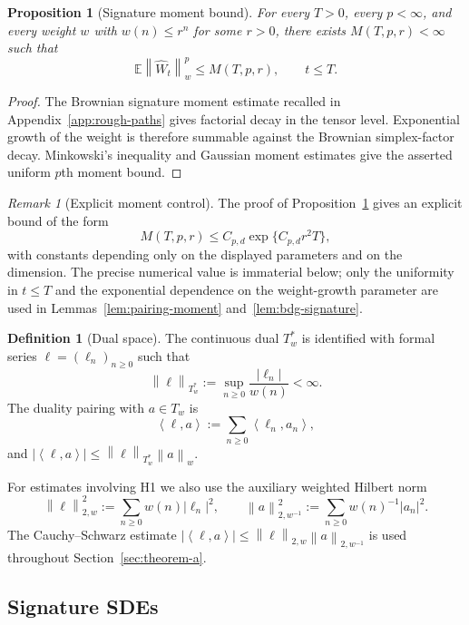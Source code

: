 \documentclass[11pt,oneside]{article}
\theoremstyle{plain}
\newtheorem{proposition}[theorem]{Proposition}
\theoremstyle{definition}
\newtheorem{definition}[theorem]{Definition}
\theoremstyle{remark}
\newtheorem{remark}[theorem]{Remark}
\newcommand{\E}{\mathbb{E}}
\newcommand{\Tw}{T_w}
\newcommand{\Tstarw}{T_w^\ast}
\newcommand{\cW}{\widehat W}
\newcommand{\norm}[1]{\left\lVert #1\right\rVert}
\newcommand{\abs}[1]{\left\lvert #1\right\rvert}
\newcommand{\inner}[2]{\left\langle #1,#2\right\rangle}
\begin{document}
\begin{proposition}[Signature moment bound]\label{prop:signature-moment}
For every $T>0$, every $p<\infty$, and every weight $w$ with $w(n)\leq r^n$ for some $r>0$, there exists $M(T,p,r)<\infty$ such that
\[
\E\norm{\cW_t}_w^p\leq M(T,p,r),\qquad t\leq T.
\]
\end{proposition}

\begin{proof}
The Brownian signature moment estimate recalled in Appendix~\ref{app:rough-paths} gives factorial decay in the tensor level. Exponential growth of the weight is therefore summable against the Brownian simplex-factor decay. Minkowski's inequality and Gaussian moment estimates give the asserted uniform $p$th moment bound.
\end{proof}

\begin{remark}[Explicit moment control]
\label{rem:explicit-moment-bound}
The proof of Proposition~\ref{prop:signature-moment} gives an explicit bound of the form
\[
M(T,p,r)\leq C_{p,d}\exp\{C_{p,d}r^2T\},
\]
with constants depending only on the displayed parameters and on the dimension. The precise numerical value is immaterial below; only the uniformity in $t\leq T$ and the exponential dependence on the weight-growth parameter are used in Lemmas~\ref{lem:pairing-moment} and~\ref{lem:bdg-signature}.
\end{remark}

\begin{definition}[Dual space]
The continuous dual $\Tstarw$ is identified with formal series $\ell=(\ell_n)_{n\geq0}$ such that
\[
\norm{\ell}_{\Tstarw}:=\sup_{n\geq0}\frac{\abs{\ell_n}}{w(n)}<\infty.
\]
The duality pairing with $a\in\Tw$ is
\[
\inner{\ell}{a}:=\sum_{n\geq0}\inner{\ell_n}{a_n},
\]
and $\abs{\inner{\ell}{a}}\leq\norm{\ell}_{\Tstarw}\norm{a}_w$.
\end{definition}

For estimates involving H1 we also use the auxiliary weighted Hilbert norm
\[
\norm{\ell}_{2,w}^2:=\sum_{n\geq0}w(n)\abs{\ell_n}^2,\qquad
\norm{a}_{2,w^{-1}}^2:=\sum_{n\geq0}w(n)^{-1}\abs{a_n}^2.
\]
The Cauchy--Schwarz estimate $\abs{\inner{\ell}{a}}\leq\norm{\ell}_{2,w}\norm{a}_{2,w^{-1}}$ is used throughout Section~\ref{sec:theorem-a}.

\subsection{Signature SDEs}
\end{document}
